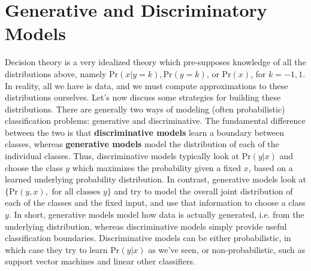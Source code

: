 \documentclass{article}
\begin{document}
\section{Generative and Discriminatory Models}
Decision theory is a very idealized theory which pre-supposes knowledge of all the distributions above, namely $ \text{Pr}(x | y = k), \text{Pr}(y = k) $, or $ \text{Pr}(x) $, for $ k = -1, 1 $. In reality, all we have is data, and we must compute approximations to these distributions ourselves. Let's now discuss some strategies for building these distributions.
\newline \newline
There are generally two ways of modeling (often probabilistic) classification problems: generative and discriminative. The fundamental difference between the two is that \textbf{discriminative models} learn a boundary between classes, whereas \textbf{generative models} model the distribution of each of the individual classes. Thus, discriminative models typically look at $ \text{Pr}(y | x) $ and choose the class $ y $ which maximizes the probability given a fixed $ x $, based on a learned underlying probability distribution. In contrast, generative models look at $ \{ \text{Pr}(y, x), \text{ for all classes } y \} $ and try to model the overall joint distribution of each of the classes and the fixed input, and use that information to choose a class $ y $.
\newline \newline
In short, generative models model how data is actually generated, i.e. from the underlying distribution, whereas discriminative models simply provide useful classification boundaries. Discriminative models can be either probabilistic, in which case they try to learn $ \text{Pr}(y | x) $ as we've seen, or non-probabilistic, such as support vector machines and linear other classifiers.
\end{document}
